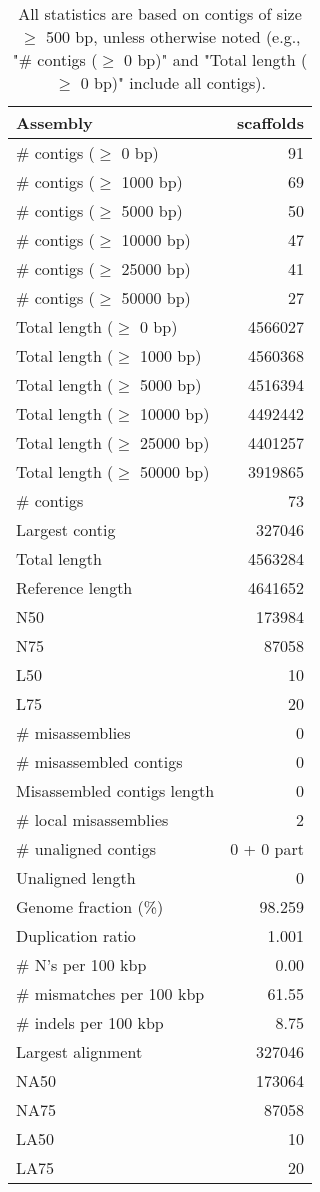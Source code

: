 \documentclass[12pt,a4paper]{article}
\begin{document}
\begin{table}[ht]
\begin{center}
\caption{All statistics are based on contigs of size $\geq$ 500 bp, unless otherwise noted (e.g., "\# contigs ($\geq$ 0 bp)" and "Total length ($\geq$ 0 bp)" include all contigs).}
\begin{tabular}{|l*{1}{|r}|}
\hline
Assembly & scaffolds \\ \hline
\# contigs ($\geq$ 0 bp) & 91 \\ \hline
\# contigs ($\geq$ 1000 bp) & 69 \\ \hline
\# contigs ($\geq$ 5000 bp) & 50 \\ \hline
\# contigs ($\geq$ 10000 bp) & 47 \\ \hline
\# contigs ($\geq$ 25000 bp) & 41 \\ \hline
\# contigs ($\geq$ 50000 bp) & 27 \\ \hline
Total length ($\geq$ 0 bp) & 4566027 \\ \hline
Total length ($\geq$ 1000 bp) & 4560368 \\ \hline
Total length ($\geq$ 5000 bp) & 4516394 \\ \hline
Total length ($\geq$ 10000 bp) & 4492442 \\ \hline
Total length ($\geq$ 25000 bp) & 4401257 \\ \hline
Total length ($\geq$ 50000 bp) & 3919865 \\ \hline
\# contigs & 73 \\ \hline
Largest contig & 327046 \\ \hline
Total length & 4563284 \\ \hline
Reference length & 4641652 \\ \hline
N50 & 173984 \\ \hline
N75 & 87058 \\ \hline
L50 & 10 \\ \hline
L75 & 20 \\ \hline
\# misassemblies & 0 \\ \hline
\# misassembled contigs & 0 \\ \hline
Misassembled contigs length & 0 \\ \hline
\# local misassemblies & 2 \\ \hline
\# unaligned contigs & 0 + 0 part \\ \hline
Unaligned length & 0 \\ \hline
Genome fraction (\%) & 98.259 \\ \hline
Duplication ratio & 1.001 \\ \hline
\# N's per 100 kbp & 0.00 \\ \hline
\# mismatches per 100 kbp & 61.55 \\ \hline
\# indels per 100 kbp & 8.75 \\ \hline
Largest alignment & 327046 \\ \hline
NA50 & 173064 \\ \hline
NA75 & 87058 \\ \hline
LA50 & 10 \\ \hline
LA75 & 20 \\ \hline
\end{tabular}
\end{center}
\end{table}
\end{document}

